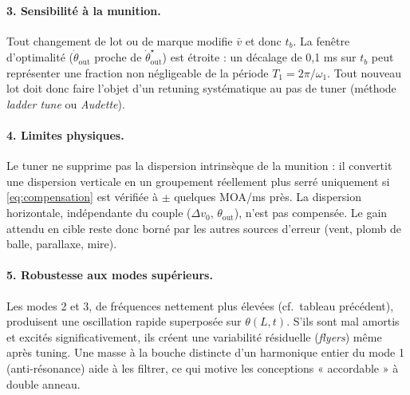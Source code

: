 \documentclass[12pt,a4paper]{article}
\begin{document}
	\paragraph{3. Sensibilité à la munition.} Tout changement de lot ou de marque modifie $\bar v$ et donc $t_b$. La fenêtre d'optimalité ($\dot\theta_\text{out}$ proche de $\dot\theta^\star_\text{out}$) est étroite : un décalage de 0,1 ms sur $t_b$ peut représenter une fraction non négligeable de la période $T_1 = 2\pi/\omega_1$. Tout nouveau lot doit donc faire l'objet d'un retuning systématique au pas de tuner (méthode \emph{ladder tune} ou \emph{Audette}).

	\paragraph{4. Limites physiques.} Le tuner ne supprime pas la dispersion intrinsèque de la munition : il convertit une dispersion verticale en un groupement réellement plus serré uniquement si \eqref{eq:compensation} est vérifiée à $\pm$ quelques MOA/ms près. La dispersion horizontale, indépendante du couple ($\Delta v_0,\, \theta_\text{out}$), n'est pas compensée. Le gain attendu en cible reste donc borné par les autres sources d'erreur (vent, plomb de balle, parallaxe, mire).

	\paragraph{5. Robustesse aux modes supérieurs.} Les modes 2 et 3, de fréquences nettement plus élevées (cf.\ tableau précédent), produisent une oscillation rapide superposée sur $\theta(L,t)$. S'ils sont mal amortis et excités significativement, ils créent une variabilité résiduelle (\emph{flyers}) même après tuning. Une masse à la bouche distincte d'un harmonique entier du mode 1 (anti-résonance) aide à les filtrer, ce qui motive les conceptions « accordable » à double anneau.
\end{document}

